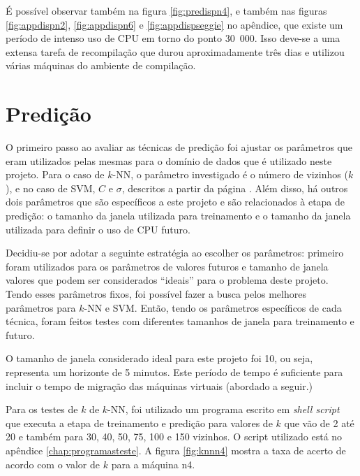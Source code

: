 É possível observar também na figura \ref{fig:predispn4}, e também nas
figuras \ref{fig:appdispn2}, \ref{fig:appdispn6} e \ref{fig:appdispseggie} no
apêndice, que existe um período de intenso uso de CPU em torno do ponto
30~000. Isso deve-se a uma extensa tarefa de recompilação que durou
aproximadamente três dias e utilizou várias máquinas do ambiente de
compilação.

\section{Predição}

O primeiro passo ao avaliar as técnicas de predição foi ajustar os
parâmetros que eram utilizados pelas mesmas para o domínio de dados que é
utilizado neste projeto. Para o caso de $k$-NN, o parâmetro investigado é o
número de vizinhos ($k$), e no caso de SVM, $C$ e $\sigma$, descritos a
partir da página \pageref{sec:margenssuaves}. Além disso, há outros dois
parâmetros que são específicos a este projeto e são relacionados à etapa de
predição: o tamanho da janela utilizada para treinamento e o tamanho da
janela utilizada para definir o uso de CPU futuro.

Decidiu-se por adotar a seguinte estratégia ao escolher os parâmetros:
primeiro foram utilizados para os parâmetros de valores futuros e tamanho
de janela valores que podem ser considerados “ideais” para o problema deste
projeto. Tendo esses parâmetros fixos, foi possível fazer a busca pelos
melhores parâmetros para $k$-NN e SVM. Então, tendo os parâmetros
específicos de cada técnica, foram feitos testes com diferentes tamanhos de
janela para treinamento e futuro.


O tamanho de janela considerado ideal para este projeto foi 10, ou seja,
representa um horizonte de 5 minutos. Este período de tempo é suficiente
para incluir o tempo de migração das máquinas virtuais (abordado a seguir.)

Para os testes de $k$ de $k$-NN, foi utilizado um programa escrito em
\emph{shell script} que executa a etapa de treinamento e predição para
valores de $k$ que vão de 2 até 20 e também para 30, 40, 50, 75, 100 e 150
vizinhos. O script utilizado está no apêndice \ref{chap:programasteste}. A
figura \ref{fig:knnn4} mostra a taxa de acerto de acordo com o valor de $k$
para a máquina n4.

